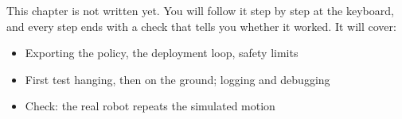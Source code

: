 \label{k:deploy}
\begin{keyidea}
This chapter is not written yet. You will follow it step by step at the keyboard, and every step ends with a check that tells you whether it worked. It will cover:
\begin{itemize}[nosep]
  \item Exporting the policy, the deployment loop, safety limits
  \item First test hanging, then on the ground; logging and debugging
  \item Check: the real robot repeats the simulated motion
\end{itemize}
\end{keyidea}
